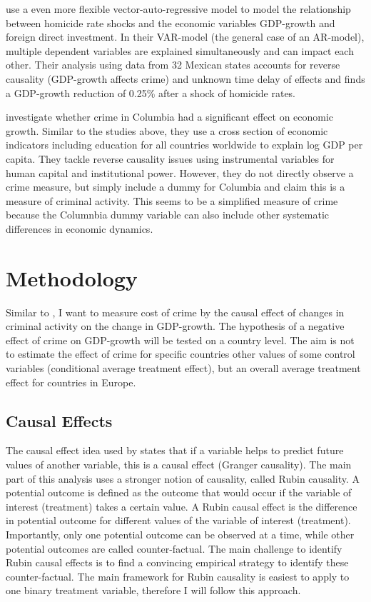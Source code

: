 \documentclass[a4paper,12pt]{article}
\begin{document}
\cite{var_model} use a even more flexible vector-auto-regressive model to model the relationship between homicide rate shocks and the economic variables GDP-growth and foreign direct investment. In their VAR-model (the general case of an AR-model), multiple dependent variables are explained simultaneously and can impact each other. Their analysis using data from 32 Mexican states accounts for reverse causality (GDP-growth affects crime) and unknown time delay of effects and finds a GDP-growth reduction of 0.25\% after a shock of homicide rates.

\cite{columbia} investigate whether crime in Columbia had a significant effect on economic growth. Similar to the studies above, they use a cross section of economic indicators including education for all countries worldwide to explain log GDP per capita. They tackle reverse causality issues using instrumental variables for human capital and institutional power. However, they do not directly observe a crime measure, but simply include a dummy for Columbia and claim this is a measure of criminal activity. This seems to be a simplified measure of crime because the Columnbia dummy variable can also include other systematic differences in economic dynamics. 



\section{Methodology}
\label{Methodology}
Similar to \cite{entorf}, I want to measure cost of crime by the causal effect of changes in criminal activity on the change in GDP-growth. The hypothesis of a negative effect of crime on GDP-growth will be tested on a country level.
The aim is not to estimate the effect of crime for specific countries other values of some control variables (conditional average treatment effect), but an overall average treatment effect for countries in Europe.

\subsection{Causal Effects}
The causal effect idea used by \cite{entorf} states that if a variable helps to predict future values of another variable, this is a causal effect (Granger causality). The main part of this analysis uses a stronger notion of causality, called Rubin causality. A potential outcome is defined as the outcome that would occur if the variable of interest (treatment) takes a certain value. 
A Rubin causal effect is the difference in potential outcome for different values of the variable of interest (treatment). 
Importantly, only one potential outcome can be observed at a time, while other potential outcomes are called counter-factual. The main challenge to identify Rubin causal effects is to find a convincing empirical strategy to identify these counter-factual. 
The main framework for Rubin causality is easiest to apply to one binary treatment variable, therefore I will follow this approach.
\end{document}
